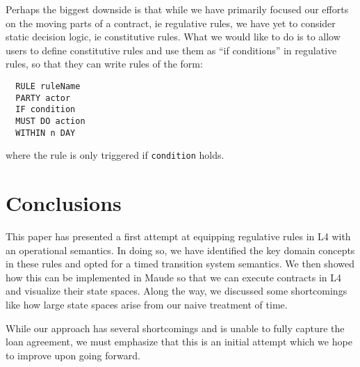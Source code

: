 \documentclass{article}
\begin{document}
Perhaps the biggest downside is that while we have primarily focused our efforts
on the moving parts of a contract, ie regulative rules, we have yet to consider
static decision logic, ie constitutive rules.
What we would like to do is to allow users to define constitutive rules
and use them as ``if conditions'' in regulative rules, so that they can
write rules of the form:

\begin{lstlisting}
  RULE ruleName
  PARTY actor
  IF condition
  MUST DO action
  WITHIN n DAY
\end{lstlisting}

where the rule is only triggered if \texttt{condition} holds.

\section{Conclusions}

This paper has presented a first attempt at equipping regulative rules in L4
with an operational semantics.
In doing so, we have identified the key domain concepts in these rules and
opted for a timed transition system semantics.
We then showed how this can be implemented in Maude so that we can execute
contracts in L4 and visualize their state spaces.
Along the way, we discussed some shortcomings like how large state spaces arise
from our naive treatment of time.

While our approach has several shortcomings and is unable to fully capture
the loan agreement, we must emphasize that this is an initial attempt which
we hope to improve upon going forward.

\newpage



\end{document}
